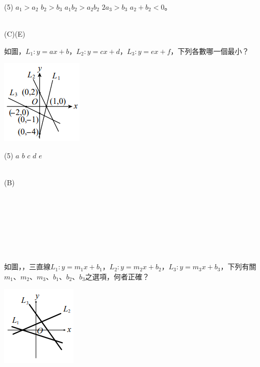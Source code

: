 \documentclass
[answers]
{exam}
\theoremstyle{definition}
\begin{document}
\begin{questions}
\begin{tasks}(5)
	\task $a_1 > a_2$
	\task $b_2 > b_3$
	\task $a_1b_2 > a_2b_2$
	\task $2a_3 > b_3$
	\task $a_2 + b_2 < 0$。
\end{tasks}
\begin{solution}~\\
	(C)(E)
\end{solution}

\question

\begin{minipage}[t]{0.7\linewidth}
	如圖，$L_1:y=ax+b$，$L_2:y=cx+d$，$L_3:y=ex+f$，下列各數哪一個最小？
\end{minipage}
\hfill
\begin{minipage}[t]{0.3\linewidth}
	\vspace*{-0.3cm}
	\includegraphics[scale=1]{./chapter_3/figure/13.png}
	\raggedleft %
\end{minipage}

\begin{tasks}(5)
	\task $a$
	\task $b$
	\task $c$
	\task $d$
	\task $e$
\end{tasks}
\begin{solution}~\\
	(B)
\end{solution}


$ $\\$ $\\$ $\\$ $\\$ $\\$ $\\

\question

\begin{minipage}[t]{0.7\linewidth}
	如圖，，三直線$L_1:y=m_1x+b_1$，$L_2:y=m_2x+b_2$，$L_3:y=m_3x+b_3$，下列有關$m_1$、$m_2$、$m_3$、$b_1$、$b_2$、$b_3$之選項，何者正確？
\end{minipage}
\hfill
\begin{minipage}[t]{0.3\linewidth}
	\vspace*{-0.3cm}
	\includegraphics[scale=1]{./chapter_3/figure/14.png}
	\raggedleft %
\end{minipage}


\end{questions}
\end{document}
